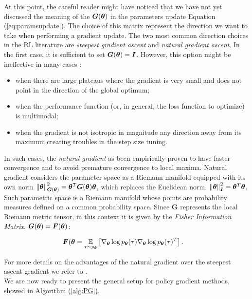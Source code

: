 At this point, the careful reader might have noticed that we have not yet discussed the meaning of the $\boldsymbol{G}(\boldsymbol{\theta})$ in the parameters update Equation (\ref{eq:paramsupdate}). The choice of this matrix represent the direction we want to take when performing a gradient update. The two most common direction choices in the \gls{RL} literature are \emph{steepest gradient ascent} and \emph{natural gradient ascent}. In the first case, it is sufficient to set $\boldsymbol{G}(\boldsymbol{\theta})=\boldsymbol{I}$. However, this option might be ineffective in many cases \cite{amari1998natural1}:

\begin{itemize}
\item when there are large plateaus where the gradient is very small and does not point in the direction of the global optimum;
\item when the performance function (or, in general, the loss function to optimize) is multimodal;
\item when the gradient is not isotropic in magnitude \wrt any direction away from its maximum,creating troubles in the step size tuning.
\end{itemize}

In such cases, the \emph{natural gradient} as been empirically proven to have faster convergence and to avoid premature convergence to local maxima. Natural gradient considers the parameter space as a Riemann manifold equipped with its own norm $\left\lVert\boldsymbol{\theta}\right\rVert^2_{\boldsymbol{G}(\boldsymbol{\theta})}=\boldsymbol{\theta}^T\boldsymbol{G}(\boldsymbol{\theta})\boldsymbol{\theta}$, which replaces the Euclidean norm, $\left\lVert\boldsymbol{\theta}\right\rVert^2_{\boldsymbol{I}}=\boldsymbol{\theta}^T\boldsymbol{\theta}$. Such parametric space is a Riemann manifold whose points are probability measures defined on a common probability space. Since $\boldsymbol{G}$ represents the local Riemann metric tensor, in this context it is given by the \emph{Fisher Information Matrix}, \ie $\boldsymbol{G}(\boldsymbol{\theta})=\boldsymbol{F}(\boldsymbol{\theta})$:

\begin{align}
\boldsymbol{F}(\boldsymbol{\theta} &= \underset{\tau\sim p_{\boldsymbol{\theta}}}{\mathbb{E}}\left[{\nabla_{\boldsymbol{\theta}}\log p_{\boldsymbol{\theta}}(\tau)\nabla_{\boldsymbol{\theta}}\log p_{\boldsymbol{\theta}}(\tau)^T}\right].
\end{align}

For more details on the advantages of the natural gradient over the steepest ascent gradient we refer to \cite{amari1998natural1, amari1998natural2, peters2008reinforcement}. \\
We are now ready to present the general setup for policy gradient methods, showed in Algorithm (\ref{alg:PG}).

